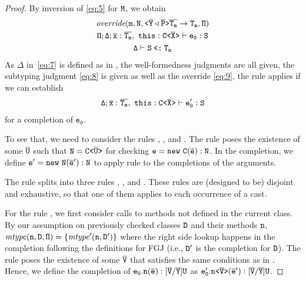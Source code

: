 \begin{proof}
    By inversion of \eqref{eq:5} for ${\tt M}$, we obtain
    \begin{gather}
      \label{eq:6}
      \mathtt{\textit{override}(m, N, \mathtt{ \texttt{<} \overline{\tt Y} \triangleleft \overline{\tt P} \texttt{>} }\overline{\tt T_m} \to T_m,
        \Pi) } \\
      \label{eq:9}
      \mathtt{\Pi; \Delta ; \overline{\tt x}:\overline{\tt T_m},\ this : \mathtt{C \texttt{<} \overline{\tt X} \texttt{>} } \vdash e_0 : S} \\
      \label{eq:8}
      \mathtt{\Delta \vdash S \mathbin{\texttt{<:}}  T_m }
    \end{gather}
    As $\mathtt{\Delta}$ in~\eqref{eq:7} is defined as in , the well-formedness
    judgments are all given, the subtyping judgment \eqref{eq:8} is given as well as the override
    \eqref{eq:9}, the rule  applies if we can establish
    \begin{gather}
      \label{eq:10}
      \mathtt{\Delta ; \overline{\tt x}:\overline{\tt T_m},\ this : \mathtt{C \texttt{<} \overline{\tt X} \texttt{>} } \vdash e_0' : S}
    \end{gather}
    for a completion of $\mathtt{e_0}$.

    To see that, we need to consider the rules ,
    , and . The 
     rule poses the existence of some $\overline{\tt U}$ such that ${\tt N} =
    \mathtt{C \texttt{<} \overline{\tt U} \texttt{>} }$ for checking ${\tt e} = {\tt new}\ {\tt C} (\overline{\tt e}) : {\tt N}$. In the completion, we
    define ${\tt e'} = {\tt new}\ {\tt N} (\overline{\tt e}') : {\tt N}$ to apply rule  to the completions
    of the arguments.

    The rule  splits into three rules
    , , and
    . These rules are (designed to be) disjoint
    and exhaustive, so that one of them applies to each occurrence of
    a cast. 

    For the rule , we first consider calls to methods not defined in the current
    class. By our assumption on previously checked classes ${\tt D}$ and their methods ${\tt n}$,
    $\mathit{mtype} ({\tt n}, {\tt D}, {\tt \Pi}) = \{\mathit{mtype}' ({\tt n}, {\tt D}')\}$ where the right
    side lookup happens in the completion following the definitions for FGJ (i.e., ${\tt D'}$ is the
    completion for ${\tt D}$). The  rule poses the existence of some $\overline{\tt V}$ that
    satisfies the same conditions as in . Hence, we define the completion of
    $\mathtt{e_0.{\tt n}(\overline{\tt e}) : [\overline{\tt V}/\overline{\tt Y}]U }$ as
    $\mathtt{e_0'.\mathtt{n \texttt{<} \overline{\tt V} \texttt{>} }(\overline{\tt e}') : [\overline{\tt V}/\overline{\tt Y}]U }$.


\end{proof}
